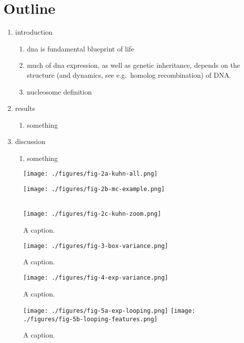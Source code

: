 \documentclass[%
 reprint,
superscriptaddress,
showpacs,preprintnumbers,
 amsmath,amssymb,
 aps,
 prl,
]{revtex4-1}
\begin{document}
\section{Outline}
\begin{enumerate}
    \item introduction
    \begin{enumerate}
        \item dna is fundamental blueprint of life
        \item much of dna expression, as well as genetic inheritance, depends on the
            structure (and dynamics, see e.g.\ homolog recombination) of DNA.\
        \item nucleosome definition
    \end{enumerate}

    \item results
    \begin{enumerate}
        \item something
    \end{enumerate}

    \item discussion
    \begin{enumerate}
        \item something
    \end{enumerate}
\end{enumerate}

\begin{figure}[t]
    \centering
    \begin{minipage}{0.65\linewidth}
        \texttt{[image: ./figures/fig-2a-kuhn-all.png]}
    \end{minipage}
    \begin{minipage}{0.30\linewidth}
        \vfill
        \texttt{[image: ./figures/fig-2b-mc-example.png]}
        \vfill
    \end{minipage}
    \\
    \texttt{[image: ./figures/fig-2c-kuhn-zoom.png]}
    \caption{A caption.}
\end{figure}
\begin{figure}[t]
    \centering
    \texttt{[image: ./figures/fig-3-box-variance.png]}
    \caption{A caption.}
\end{figure}
\begin{figure}[t]
    \centering
    \texttt{[image: ./figures/fig-4-exp-variance.png]}
    \caption{A caption.}
\end{figure}
\begin{figure}[t]
    \centering
    \texttt{[image: ./figures/fig-5a-exp-looping.png]}
    \texttt{[image: ./figures/fig-5b-looping-features.png]}
    \caption{A caption.}
\end{figure}
\end{document}
